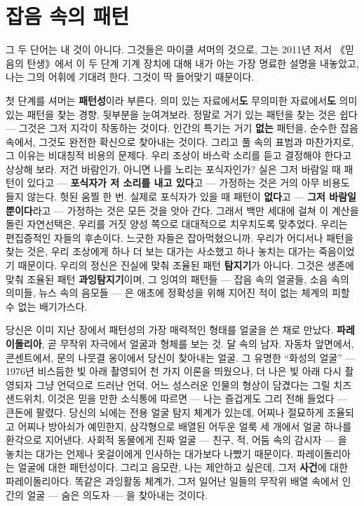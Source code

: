 \section*{잡음 속의 패턴}

그 두 단어는 내 것이 아니다. 그것들은 마이클 셔머의 것으로, 그는 2011년 저서 《믿음의 탄생》에서 이 두 단계 기계 장치에 대해 내가 아는 가장 명료한 설명을 내놓았고, 나는 그의 어휘에 기대려 한다. 그것이 딱 들어맞기 때문이다.

첫 단계를 셔머는 \textbf{패턴성}이라 부른다. 의미 있는 자료에서\textbf{도} 무의미한 자료에서\textbf{도} 의미 있는 패턴을 찾는 경향. 뒷부분을 눈여겨보라. 정말로 거기 있는 패턴을 찾는 것은 쉽다 — 그것은 그저 지각이 작동하는 것이다. 인간의 특기는 거기 \textbf{없는} 패턴을, 순수한 잡음 속에서, 그것도 완전한 확신으로 찾아내는 것이다. 그리고 풀 속의 표범과 마찬가지로, 그 이유는 비대칭적 비용의 문제다. 우리 조상이 바스락 소리를 듣고 결정해야 한다고 상상해 보라. 저건 바람인가, 아니면 나를 노리는 포식자인가? 실은 그저 바람일 때 패턴이 있다고 — \textbf{포식자가 저 소리를 내고 있다}고 — 가정하는 것은 거의 아무 비용도 들지 않는다. 헛된 움찔 한 번. 실제로 포식자가 있을 때 패턴이 \textbf{없다}고 — \textbf{그저 바람일 뿐이다}라고 — 가정하는 것은 모든 것을 앗아 간다. 그래서 백만 세대에 걸쳐 이 계산을 돌린 자연선택은, 우리를 거짓 양성 쪽으로 대대적으로 치우치도록 맞추었다. 우리는 편집증적인 자들의 후손이다. 느긋한 자들은 잡아먹혔으니까. 우리가 어디서나 패턴을 찾는 것은, 우리 조상에게 하나 더 보는 대가는 사소했고 하나 놓치는 대가는 죽음이었기 때문이다. 우리의 정신은 진실에 맞춰 조율된 패턴 \textbf{탐지기}가 아니다. 그것은 생존에 맞춰 조율된 패턴 \textbf{과잉탐지기}이며, 그 잉여의 패턴들 — 잡음 속의 얼굴들, 소음 속의 의미들, 뉴스 속의 음모들 — 은 애초에 정확성을 위해 지어진 적이 없는 체계의 피할 수 없는 배기가스다.

당신은 이미 지난 장에서 패턴성의 가장 매력적인 형태를 얼굴을 쓴 채로 만났다. \textbf{파레이돌리아}, 곧 무작위 자극에서 얼굴과 형체를 보는 것. 달 속의 남자. 자동차 앞면에서, 콘센트에서, 문의 나뭇결 옹이에서 당신이 찾아내는 얼굴. 그 유명한 ``화성의 얼굴'' — 1976년 비스듬한 빛 아래 촬영되어 천 가지 이론을 띄웠으나, 더 나은 빛 아래 다시 촬영되자 그냥 언덕으로 드러난 언덕. 어느 성스러운 인물의 형상이 담겼다는 그릴 치즈 샌드위치, 이것은 믿을 만한 소식통에 따르면 — 나는 즐겁게도 그리 전해 들었다 — 큰돈에 팔렸다. 당신의 뇌에는 전용 얼굴 탐지 체계가 있는데, 어찌나 절묘하게 조율되고 어찌나 방아쇠가 예민한지, 삼각형으로 배열된 어두운 얼룩 세 개에서 얼굴 하나를 환각으로 지어낸다. 사회적 동물에게 진짜 얼굴 — 친구, 적, 어둠 속의 감시자 — 을 놓치는 대가는 언제나 옷걸이에게 인사하는 대가보다 나빴기 때문이다. 파레이돌리아는 얼굴에 대한 패턴성이다. 그리고 음모란, 나는 제안하고 싶은데, 그저 \textbf{사건}에 대한 파레이돌리아다. 똑같은 과잉활동 체계가, 그저 일어난 일들의 무작위 배열 속에서 인간의 얼굴 — 숨은 의도자 — 을 찾아내는 것이다.

